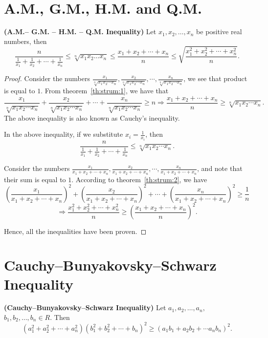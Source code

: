 \section{A.M., G.M., H.M. and Q.M.}
\begin{theorem}
  \textbf{\rm\bf (A.M.-- G.M. -- H.M. -- Q.M. Inequality)} Let $x_1, x_2, \ldots, x_n$ be positive real numbers, then
  \begin{equation}
  \frac{n}{\frac{1}{x_1} + \frac{1}{x_2} + \cdots + \frac{1}{x_n}} \leq \sqrt[n]{x_1x_2 \ldots x_n}\leq \frac{x_1 + x_2 + \cdots
    + x_n}{n}\leq \sqrt{\frac{x_1^2 + x_2^2 + \cdots + x_n^2}{n}}.
  \end{equation}
\end{theorem}

\begin{proof}
  Consider the numbers $\frac{x_1}{\sqrt[n]{x_1x_2\cdots x_n}}, \frac{x_2}{\sqrt[n]{x_1x_2\cdots x_n}}, \cdots,
  \frac{x_n}{\sqrt[n]{x_1x_2\cdots x_n}}$, we see that product is equal to $1$. From theorem~\ref{th:strum:1}, we have that
  $$\frac{x_1}{\sqrt[n]{x_1x_2\cdots x_n}} + \frac{x_2}{\sqrt[n]{x_1x_2\cdots x_n}} + \cdots + \frac{x_n}{\sqrt[n]{x_1x_2\cdots
      x_n}}\geq n \Rightarrow \frac{x_1 + x_2 + \cdots + x_n}{n}\geq \sqrt[n]{x_1x_2\cdots x_n}.$$
  The above inequality is also known as Cauchy's inequality.

  In the above inequality, if we substitute $x_i = \frac{1}{x_i}$, then $$\frac{n}{\frac{1}{x_1} + \frac{1}{x_2} + \cdots +
    \frac{1}{x_n}} \leq \sqrt[n]{x_1x_2 \cdots x_n}.$$

  Consider the numbers $\frac{x_1}{x_1 + x_2 + \cdots + x_n}, \frac{x_2}{x_1 + x_2 + \cdots + x_n}, \cdots, \frac{x_n}{x_1 + x_2 +
    \cdots + x_n}$, and note that their sum is equal to $1$. According to theorem~\ref{th:strum:2}, we have $$\left(\frac{x_1}{x_1 +
    x_2 + \cdots + x_n}\right)^2 + \left(\frac{x_2}{x_1 + x_2 + \cdots + x_n}\right)^2 + \cdots + \left(\frac{x_n}{x_1 + x_2 +
    \cdots + x_n}\right)^2 \geq \frac{1}{n}$$
  $$\Rightarrow \frac{x_1^2 + x_2^2 + \cdots + x_n^2}{n}\geq \left(\frac{x_1 + x_2 + \cdots + x_n}{n}\right)^2.$$

  Hence, all the inequalities have been proven.
\end{proof}

\section{Cauchy–Bunyakovsky–Schwarz Inequality}
\begin{theorem}
  {\rm \bf (Cauchy–Bunyakovsky–Schwarz Inequality)} Let $a_1, a_2, \ldots, a_n,$ $b_1, b_2, \ldots, b_n \in R$. Then
  \begin{equation}
    (a_1^2 + a_2^2 + \cdots + a_n^2)(b_1^2 + b_2^2 + \cdots + b_n)^2 \geq (a_1b_1 + a_2b_2 + \cdots a_nb_n)^2.
  \end{equation}
\end{theorem}

